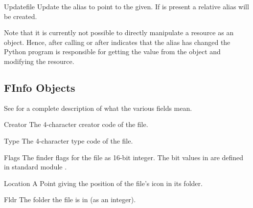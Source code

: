 \begin{methoddesc}[Alias]{Update}{file}
Update the alias to point to the  given. If  is
present a relative alias will be created.
\end{methoddesc}

Note that it is currently not possible to directly manipulate a
resource as an  object. Hence, after calling
 or after  indicates that the alias
has changed the Python program is responsible for getting the
 value from the  object and modifying the
resource.


\subsection{FInfo Objects \label{finfo-objects}}

See  for a complete description of what
the various fields mean.

\begin{memberdesc}[FInfo]{Creator}
The 4-character creator code of the file.
\end{memberdesc}

\begin{memberdesc}[FInfo]{Type}
The 4-character type code of the file.
\end{memberdesc}

\begin{memberdesc}[FInfo]{Flags}
The finder flags for the file as 16-bit integer. The bit values in
 are defined in standard module .
\end{memberdesc}

\begin{memberdesc}[FInfo]{Location}
A Point giving the position of the file's icon in its folder.
\end{memberdesc}

\begin{memberdesc}[FInfo]{Fldr}
The folder the file is in (as an integer).
\end{memberdesc}
